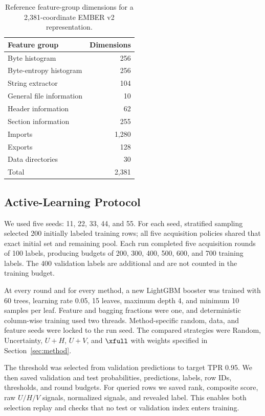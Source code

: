 \begin{table}[t]
\centering
\caption{Reference feature-group dimensions for a 2,381-coordinate EMBER v2 representation.}
\label{tab:feature-groups}
\small
\begin{tabular}{lr}
\toprule
Feature group & Dimensions \\
\midrule
Byte histogram & 256 \\
Byte-entropy histogram & 256 \\
String extractor & 104 \\
General file information & 10 \\
Header information & 62 \\
Section information & 255 \\
Imports & 1,280 \\
Exports & 128 \\
Data directories & 30 \\
\midrule
Total & 2,381 \\
\bottomrule
\end{tabular}
\end{table}

\subsection{Active-Learning Protocol}

We used five seeds: 11, 22, 33, 44, and 55. For each seed, stratified sampling
selected 200 initially labeled training rows; all five acquisition policies shared
that exact initial set and remaining pool. Each run completed five acquisition
rounds of 100 labels, producing budgets of 200, 300, 400, 500, 600, and 700
training labels. The 400 validation labels are additional and are not counted in
the training budget.

At every round and for every method, a new LightGBM booster was trained with 60
trees, learning rate 0.05, 15 leaves, maximum depth 4, and minimum 10 samples per
leaf. Feature and bagging fractions were one, and deterministic column-wise
training used two threads. Method-specific random, data, and feature seeds were
locked to the run seed. The compared strategies were Random, Uncertainty, $U+H$,
$U+V$, and $\xfull$ with weights specified in Section~\ref{sec:method}.

The threshold was selected from validation predictions to target TPR 0.95. We
then saved validation and test probabilities, predictions, labels, row IDs,
thresholds, and round budgets. For queried rows we saved rank, composite score,
raw $U/H/V$ signals, normalized signals, and revealed label. This enables both
selection replay and checks that no test or validation index enters training.

